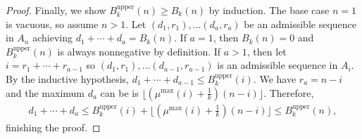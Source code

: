 \documentclass[11pt,reqno]{amsart}
\theoremstyle{plain}
\newtheorem{proposition}[theorem]{Proposition}
\theoremstyle{definition}
\theoremstyle{remark}
\numberwithin{equation}{section}
\numberwithin{equation}{section}
\newcommand{\up}{\textrm{upper}}
\newcommand{\low}{\textrm{lower}}
\begin{document}
\begin{proof}
Finally, we show $B_k^{\up}(n) \geq B_k(n)$ by induction. The base case $n=1$ is vacuous, so assume $n>1$. Let $(d_1,r_1),\ldots(d_a,r_a)$ be an admissible sequence in $A_n$ achieving $d_1+\cdots+d_a=B_k(n)$. If $a=1$, then $B_k(n)=0$ and $B_k^{\up}(n)$ is always nonnegative by definition. If $a>1$, then let $i=r_1+\cdots+r_{a-1}$ so $(d_1,r_1),\ldots(d_{a-1},r_{a-1})$ is an admissible sequence in $A_i$. By the inductive hypothesis, $d_1+\cdots+d_{a-1}\leq B_k^{\up}(i)$. We have $r_a=n-i$ and the maximum $d_a$ can be is $\lfloor(\mu^{\max}(i)+\frac{1}{k})(n-i)\rfloor$. Therefore,
\begin{align*}
   d_1+\cdots+d_{a}\leq B_k^{\up}(i)+\lfloor(\mu^{\max}(i)+\frac{1}{k})(n-i)\rfloor\leq B_k^{\up}(n),
\end{align*}
finishing the proof.
\end{proof}

\end{document}
